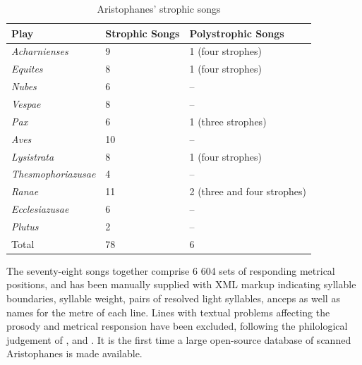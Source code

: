 \documentclass[twoside]{article}
\begin{document}
\begin{table}[htbp]
    \centering
    \begin{tabular}{l l l}
        \hline
        Play                               & Strophic Songs & Polystrophic Songs          \\
        \hline
        \textit{Acharnienses}              & 9              & 1 (four strophes)           \\
        \textit{Equites}                   & 8              & 1 (four strophes)           \\
        \textit{Nubes}                     & 6              & --                          \\
        \textit{Vespae}                    & 8              & --                          \\
        \textit{Pax}                       & 6              & 1 (three strophes)          \\
        \textit{Aves}                      & 10             & --                          \\
        \textit{Lysistrata}                & 8              & 1 (four strophes)           \\
        \textit{Thesmophoriazusae}         & 4              & --                          \\
        \textit{Ranae}                     & 11             & 2 (three and four strophes) \\
        \textit{Ecclesiazusae}             & 6              & --                          \\
        \textit{Plutus}                    & 2              & --                          \\
        \hline
        Total                              & 78             & 6                           \\
        \hline
    \end{tabular}
    \caption{Aristophanes' strophic songs}
    \label{tab:comedies}
\end{table}

The seventy-eight songs together comprise 6 604 sets of responding metrical positions, and has been manually supplied with XML markup indicating syllable boundaries, syllable weight, pairs of resolved light syllables, anceps as well as names for the metre of each line. Lines with textual problems affecting the prosody and metrical responsion have been excluded, following the philological judgement of \textcite{parkerSongsAristophanes1997}, \textcite{wilsonAristophanisFabulaeTomus2007} and \textcite{wilsonAristophanisFabulaeTomus2007a}. It is the first time a large open-source database of scanned Aristophanes is made available. 
\end{document}
